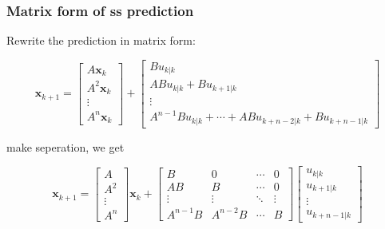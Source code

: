 \documentclass{beamer}
\begin{document}
\begin{frame}
\frametitle{Matrix form of ss prediction}

Rewrite the prediction in matrix form:

\begin{small} 
\begin{equation}
\mathbf{x}_{k+1} =
\left[
\begin{array}{c}{A \textbf{x}_{k}} 
\\ {A^{2} \textbf{x}_{k}} 
\\ {\vdots} 
\\ A^{n} \textbf{x}_k\end{array}\right]
+\left[\begin{array}{c}{B u_{k |k}} 
\\ {A B u_{k| k}+B u_{k+1| k}} \\ {\vdots} \\ {A^{n-1} B u_{k| k}+\cdots+A B u_{k+n-2| k}+B u_{k+n-1 |k}}\end{array}\right]
\end{equation}
\end{small}

make seperation, we get

\begin{small}
	\begin{equation}
	\textbf{x}_{k+1}=\left[\begin{array}{c}{A} \\ {A^{2}} \\ {\vdots} \\ {A^{n}}\end{array}\right] \textbf{x}_{k}+\left[\begin{array}{cccc}{B} & {0} & {\cdots} & {0} \\ {A B} & {B} & {\cdots} & {0} \\ {\vdots} & {\vdots} & {\ddots} & {\vdots} \\ {A^{n-1} B} & {A^{n-2} B} & {\cdots} & {B}\end{array}\right]\left[\begin{array}{c}{u_{k| k}} \\ {u_{k+1 |k}} \\ {\vdots} \\ {u_{k+n-1 |k}}\end{array}\right]
	\end{equation}
\end{small}

\end{frame}
\end{document}
